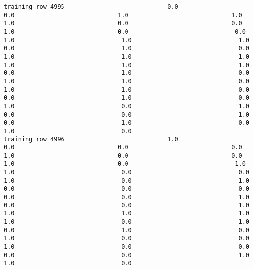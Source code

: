 \documentclass[11pt]{article}
\begin{document}
\begin{verbatim}
training row 4995                             0.0                             0.0                             1.0                             1.0                             1.0                             0.0                             0.0                             1.0                             0.0                              0.0                              1.0                              1.0                              1.0                              0.0                              1.0                              0.0                              1.0                              1.0                              1.0                              1.0                              1.0                              1.0                              0.0                              1.0                              0.0                              1.0                              1.0                              0.0                              1.0                              1.0                              0.0                              0.0                              1.0                              0.0                              1.0                              0.0                              1.0                              0.0                              0.0                              1.0                              0.0                              1.0                              0.0                              1.0                              0.0
training row 4996                             1.0                             0.0                             0.0                             0.0                             1.0                             0.0                             0.0                             1.0                             0.0                              1.0                              1.0                              0.0                              0.0                              1.0                              0.0                              1.0                              0.0                              0.0                              0.0                              0.0                              0.0                              1.0                              0.0                              0.0                              1.0                              1.0                              1.0                              1.0                              1.0                              0.0                              1.0                              0.0                              1.0                              0.0                              1.0                              0.0                              0.0                              1.0                              0.0                              0.0                              0.0                              0.0                              1.0                              1.0                              0.0

\end{verbatim}
\end{document}
